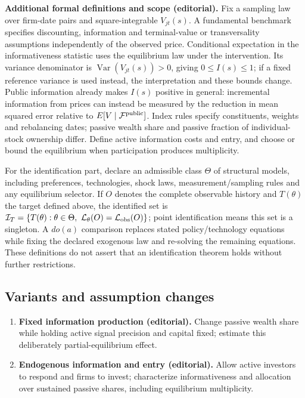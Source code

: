 \documentclass[11pt,a4paper]{article}
\begin{document}
\textbf{Additional formal definitions and scope (editorial).} Fix a sampling law over firm-date pairs and square-integrable \(V_{jt}(s)\). A fundamental benchmark specifies discounting, information and terminal-value or transversality assumptions independently of the observed price. Conditional expectation in the informativeness statistic uses the equilibrium law under the intervention. Its variance denominator is \(\operatorname{Var}(V_{jt}(s))>0\), giving \(0\leq I(s)\leq1\); if a fixed reference variance is used instead, the interpretation and these bounds change. Public information already makes \(I(s)\) positive in general: incremental information from prices can instead be measured by the reduction in mean squared error relative to \(E[V\mid\mathcal F^{\rm public}]\). Index rules specify constituents, weights and rebalancing dates; passive wealth share and passive fraction of individual-stock ownership differ. Define active information costs and entry, and choose or bound the equilibrium when participation produces multiplicity.

For the identification part, declare an admissible class \(\Theta\) of structural models, including preferences, technologies, shock laws, measurement/sampling rules and any equilibrium selector. If \(O\) denotes the complete observable history and \(T(\theta)\) the target defined above, the identified set is \(\mathcal I_T=\{T(\theta):\theta\in\Theta,\ \mathcal L_\theta(O)=\mathcal L_{\rm obs}(O)\}\); point identification means this set is a singleton. A \(do(a)\) comparison replaces stated policy/technology equations while fixing the declared exogenous law and re-solving the remaining equations. These definitions do not assert that an identification theorem holds without further restrictions.
\subsection*{Variants and assumption changes}
\begin{enumerate}
\item \textbf{Fixed information production (editorial).} Change passive wealth share while holding active signal precision and capital fixed; estimate this deliberately partial-equilibrium effect.
\item \textbf{Endogenous information and entry (editorial).} Allow active investors to respond and firms to invest; characterize informativeness and allocation over sustained passive shares, including equilibrium multiplicity.
\end{enumerate}
\end{document}
